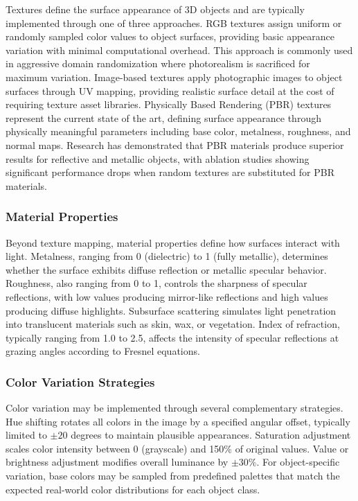 Textures define the surface appearance of 3D objects and are typically implemented through one of three approaches. RGB textures assign uniform or randomly sampled color values to object surfaces, providing basic appearance variation with minimal computational overhead. This approach is commonly used in aggressive domain randomization where photorealism is sacrificed for maximum variation. Image-based textures apply photographic images to object surfaces through UV mapping, providing realistic surface detail at the cost of requiring texture asset libraries. Physically Based Rendering (PBR) textures represent the current state of the art, defining surface appearance through physically meaningful parameters including base color, metalness, roughness, and normal maps. Research has demonstrated that PBR materials produce superior results for reflective and metallic objects, with ablation studies showing significant performance drops when random textures are substituted for PBR materials.

\subsubsection{Material Properties}

Beyond texture mapping, material properties define how surfaces interact with light. Metalness, ranging from 0 (dielectric) to 1 (fully metallic), determines whether the surface exhibits diffuse reflection or metallic specular behavior. Roughness, also ranging from 0 to 1, controls the sharpness of specular reflections, with low values producing mirror-like reflections and high values producing diffuse highlights. Subsurface scattering simulates light penetration into translucent materials such as skin, wax, or vegetation. Index of refraction, typically ranging from 1.0 to 2.5, affects the intensity of specular reflections at grazing angles according to Fresnel equations.

\subsubsection{Color Variation Strategies}

Color variation may be implemented through several complementary strategies. Hue shifting rotates all colors in the image by a specified angular offset, typically limited to $\pm20$ degrees to maintain plausible appearances. Saturation adjustment scales color intensity between 0 (grayscale) and 150\% of original values. Value or brightness adjustment modifies overall luminance by $\pm30\%$. For object-specific variation, base colors may be sampled from predefined palettes that match the expected real-world color distributions for each object class.

